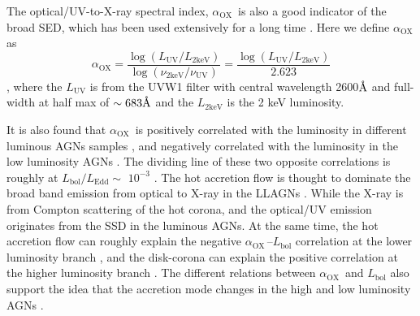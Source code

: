 \documentclass[twocolumn]{aastex63}
\newcommand{\alphaox}{$\alpha_\mathrm{OX}$}
\newcommand{\angstrom}{\text{\normalfont\AA}}
\begin{document}
The optical/UV-to-X-ray spectral index, \alphaox\, is also a good indicator of the broad SED, which has been used extensively for a long time \citep[e.g.][]{1979ApJ...234L...9T}. Here we define \alphaox\, as 
\begin{equation}
\alpha_\mathrm{OX} = \frac{\log (L_\mathrm{UV} / L_\mathrm{2keV} )} {\log (\nu_\mathrm{2keV} /  \nu_\mathrm{UV} )}=\frac{\log (L_\mathrm{UV} / L_\mathrm{2keV} )}{2.623}
\label{definition_alpha_ox}
\end{equation}
, where the $L_\mathrm{UV}$ is from the UVW1 filter with central wavelength {2600{$\angstrom$}} and full-width at half max of $\sim 683\angstrom$ \citep{2008MNRAS.383..627P} and the $L_\mathrm{2keV}$ is the 2 keV luminosity.



It is also found that  \alphaox\, is positively correlated with the luminosity in different luminous AGNs samples \citep[e.g.][]{2010A&A...512A..34L, 2013A&A...550A..71V,2016ApJ...819..154L}, and negatively correlated with the luminosity in the low luminosity AGNs \citep[e.g.][]{2011ApJ...739...64X,2017MNRAS.471.2848L}. The dividing line of these two opposite correlations is roughly at $L_\mathrm{bol}/L_\mathrm{Edd} \sim$ $10^{-3}$ \citep{2011ApJ...739...64X,2017MNRAS.471.2848L}. The hot accretion flow is thought to dominate the broad band emission from optical to X-ray in the LLAGNs \citep[see reviews in ][]{2014ARA&A..52..529Y}. While the X-ray is from Compton scattering of the hot corona, and the optical/UV emission originates from the SSD in the luminous AGNs. At the same time, the hot accretion flow can roughly explain the negative \alphaox\,--$L_\mathrm{bol}$ correlation at the lower luminosity branch \citep{2011ApJ...739...64X,2017MNRAS.471.2848L}, and the disk-corona can explain the positive correlation at the higher luminosity branch \citep{2017A&A...602A..79L, 2018MNRAS.480.1247K,2019A&A...628A.135A}. The different relations between \alphaox\, and $L_\mathrm{bol}$ also support the idea that the accretion mode changes in the high and low luminosity AGNs \citep[see][]{2011MNRAS.413.2259S,2019ApJ...883...76R}. 
\end{document}
